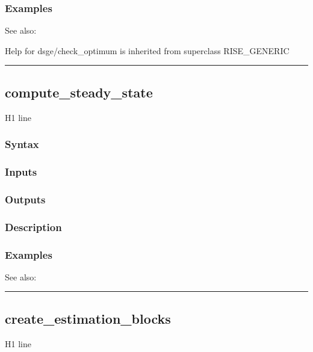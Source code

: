 \documentclass[letterpaper,10pt,english]{sphinxmanual}
\begin{document}
\subsubsection{Examples}
\label{classes/models/@dsge/dsge:id7}
See also:

Help for dsge/check\_optimum is inherited from superclass RISE\_GENERIC


\bigskip\hrule{}\bigskip



\subsection{compute\_steady\_state}
\label{classes/models/@dsge/dsge:id8}\label{classes/models/@dsge/dsge:compute-steady-state}
H1 line


\subsubsection{Syntax}
\label{classes/models/@dsge/dsge:id9}

\subsubsection{Inputs}
\label{classes/models/@dsge/dsge:id10}

\subsubsection{Outputs}
\label{classes/models/@dsge/dsge:id11}

\subsubsection{Description}
\label{classes/models/@dsge/dsge:id12}

\subsubsection{Examples}
\label{classes/models/@dsge/dsge:id13}
See also:


\bigskip\hrule{}\bigskip



\subsection{create\_estimation\_blocks}
\label{classes/models/@dsge/dsge:create-estimation-blocks}\label{classes/models/@dsge/dsge:id14}
H1 line
\end{document}
